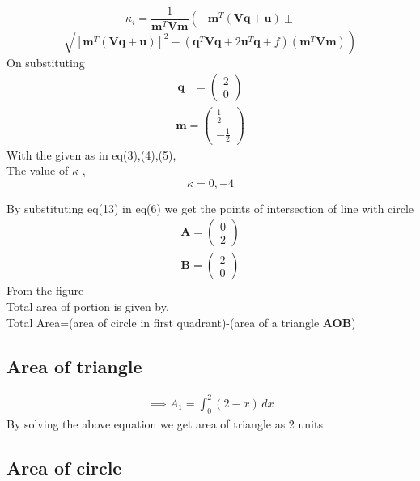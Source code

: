 \documentclass[journal,12pt,twocolumn]{IEEEtran}
\let\vec\mathbf
\newcommand{\myvec}[1]{\ensuremath{\begin{pmatrix}#1\end{pmatrix}}}
\providecommand{\brak}[1]{\ensuremath{\left(#1\right)}}
\providecommand{\lbrak}[1]{\ensuremath{\left(#1\right.}}
\providecommand{\rbrak}[1]{\ensuremath{\left.#1\right)}}
\providecommand{\sbrak}[1]{\ensuremath{{}\left[#1\right]}}
\begin{document}
\begin{equation*}
\kappa_i = \frac{1}
{
\vec{m}^T\vec{V}\vec{m}
}
\lbrak{-\vec{m}^T\brak{\vec{V}\vec{q}+\vec{u}}}
\pm
\end{equation*}
\begin{equation}
\rbrak{\sqrt{
\sbrak{
\vec{m}^T\brak{\vec{V}\vec{q}+\vec{u}}
}^2
-
\brak
{
\vec{q}^T\vec{V}\vec{q} + 2\vec{u}^T\vec{q} +f
}
\brak{\vec{m}^T\vec{V}\vec{m}}
}
}
\end{equation}
On substituting\\
\begin{align}
\vec{q} &= \myvec{
2\\
0
} 
\end{align}
\begin{align}
\vec{m} = \myvec{\frac{1}{2} \\ -\frac{1}{2}}
\end{align}
With the given as in eq(3),(4),(5),\\ 

The value of $\kappa$ ,\\
\begin{equation}
\kappa =0,-4
\end{equation}
    
By substituting eq(13) in eq(6) we get the
points of intersection of line with circle \\
\begin{align}
    \vec{A}=\myvec{
0\\
2
    }
\end{align}
\begin{align}
    \vec{B}=\myvec{
2\\
0
    }
\end{align}
From the figure \\
Total area of portion is given by,\\ 
Total Area=(area of circle in first quadrant)-(area of a triangle \textbf{AOB})

\subsection*{Area of triangle}

\begin{align}
\implies A_1=\int_{0}^{2} (2-x) \,dx
\end{align}
By solving the above equation we get area of triangle as 2 units
\subsection*{Area of circle}
\end{document}
